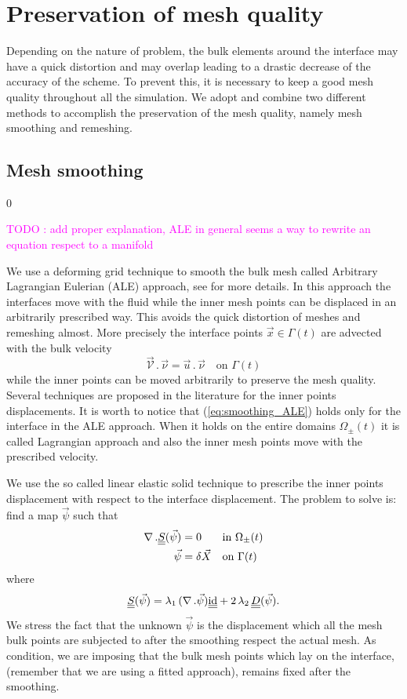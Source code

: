 \documentclass[a4paper,12pt,onecolumn]{article}
\newcommand{\id}{\rm id}
\newcommand{\mat}[1]{\underline{\underline{#1}}\rule{0pt}{0pt}}
\begin{document}
\section{Preservation of mesh quality}

Depending on the nature of problem, the bulk elements around the interface may
have a quick distortion and may overlap leading to a drastic decrease of the
accuracy of the scheme. To prevent this, it is necessary to keep a good mesh
quality throughout all the simulation. We adopt and combine two different
methods to accomplish the preservation of the mesh quality, namely mesh
smoothing and remeshing.

\subsection{Mesh smoothing} \label{subsec:smoothing}
\setcounter{equation} 0

\textcolor{magenta}{TODO : add proper explanation, ALE in general seems a way
to rewrite an equation respect to a manifold}

We use a deforming grid technique to smooth the bulk mesh called Arbitrary
Lagrangian Eulerian (ALE) approach, see \cite{GanesanPhd} for more details. In
this approach the interfaces move with the fluid while the inner mesh points can
be displaced in an arbitrarily prescribed way. This avoids the quick distortion
of meshes and remeshing almost. More precisely the interface points $\vec x \in
\Gamma(t)$ are advected with the bulk velocity
\begin{equation}\label{eq:smoothing_ALE}
\vec{\mathcal{V}}\,.\,\vec\nu = \vec u\,.\,\vec \nu\quad \mbox{on }\Gamma(t)
\end{equation}
while the inner points can be moved arbitrarily to preserve the mesh quality.
Several techniques are proposed in the literature for the inner points
displacements. It is worth to notice that (\ref{eq:smoothing_ALE}) holds only
for the interface in the ALE approach. When it holds on the entire domains
$\Omega_{\pm}(t)$ it is called Lagrangian approach and also the inner mesh
points move with the prescribed velocity.

We use the so called linear elastic solid technique to prescribe the inner
points displacement with respect to the interface displacement. The problem to
solve is: find a map $\vec \psi$ such that
\begin{align}
 \nabla\,.\mat S(\vec \psi) &= 0 && \mbox{in }\Omega_{\pm}(t)\\
 \vec \psi &= \delta \vec X && \mbox{on } \Gamma(t)
\end{align}
where
\begin{equation} \label{eq:elasticity_tensor}
\mat S(\vec \psi) = \lambda_1 \,(\nabla\,.\vec\psi)\mat\id + 2\,\lambda_2\,
\mat D(\vec\psi).
\end{equation}
We stress the fact that the unknown $\vec\psi$ is the displacement which all
the mesh bulk points are subjected to after the smoothing respect the actual
mesh. As condition, we are imposing that the bulk mesh points which lay on the
interface, (remember that we are using a fitted approach), remains fixed after
the smoothing.
\end{document}
